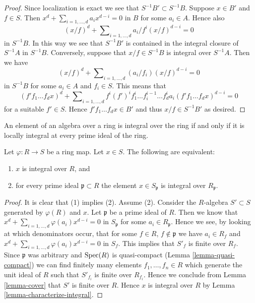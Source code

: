 \begin{proof}
Since localization is exact we see that $S^{-1}B' \subset S^{-1}B$.
Suppose $x \in B'$ and $f \in S$. Then
$x^d + \sum_{i = 1, \ldots, d} a_i x^{d - i} = 0$
in $B$ for some $a_i \in A$. Hence also
$$
(x/f)^d + \sum\nolimits_{i = 1, \ldots, d} a_i/f^i (x/f)^{d - i} = 0
$$
in $S^{-1}B$. In this way we see that $S^{-1}B'$ is contained in
the integral closure of $S^{-1}A$ in $S^{-1}B$. Conversely, suppose
that $x/f \in S^{-1}B$ is integral over $S^{-1}A$. Then we have
$$
(x/f)^d + \sum\nolimits_{i = 1, \ldots, d} (a_i/f_i) (x/f)^{d - i} = 0
$$
in $S^{-1}B$ for some $a_i \in A$ and $f_i \in S$. This means that
$$
(f'f_1 \ldots f_d x)^d +
\sum\nolimits_{i = 1, \ldots, d}
f^i(f')^if_1^i \ldots f_i^{i - 1} \ldots f_d^i a_i
(f'f_1 \ldots f_dx)^{d - i} = 0
$$
for a suitable $f' \in S$. Hence $f'f_1\ldots f_dx \in B'$ and thus
$x/f \in S^{-1}B'$ as desired.
\end{proof}

\begin{lemma}
\label{lemma-integral-closure-stalks}
\begin{slogan}
An element of an algebra over a ring is integral over the ring
if and only if it is locally integral at every prime ideal of the ring.
\end{slogan}
Let $\varphi : R \to S$ be a ring map.
Let $x \in S$. The following are equivalent:
\begin{enumerate}
\item $x$ is integral over $R$, and
\item for every prime ideal $\mathfrak p \subset R$ the element
$x \in S_{\mathfrak p}$ is integral over $R_{\mathfrak p}$.
\end{enumerate}
\end{lemma}

\begin{proof}
It is clear that (1) implies (2). Assume (2). Consider the $R$-algebra
$S' \subset S$ generated by $\varphi(R)$ and $x$. Let $\mathfrak p$ be
a prime ideal of $R$. Then we know that
$x^d + \sum_{i = 1, \ldots, d} \varphi(a_i) x^{d - i} = 0$
in $S_{\mathfrak p}$ for some $a_i \in R_{\mathfrak p}$. Hence we see,
by looking at which denominators occur, that
for some $f \in R$, $f \not \in \mathfrak p$ we have
$a_i \in R_f$ and
$x^d + \sum_{i = 1, \ldots, d} \varphi(a_i) x^{d - i} = 0$
in $S_f$. This implies that $S'_f$ is finite over $R_f$.
Since $\mathfrak p$ was arbitrary and $\mathop{\mathrm{Spec}}(R)$ is quasi-compact
(Lemma \ref{lemma-quasi-compact}) we can find finitely many elements
$f_1, \ldots, f_n \in R$
which generate the unit ideal of $R$ such that $S'_{f_i}$ is finite
over $R_{f_i}$. Hence we conclude from Lemma \ref{lemma-cover} that
$S'$ is finite over $R$. Hence $x$ is integral over $R$ by
Lemma \ref{lemma-characterize-integral}.
\end{proof}

